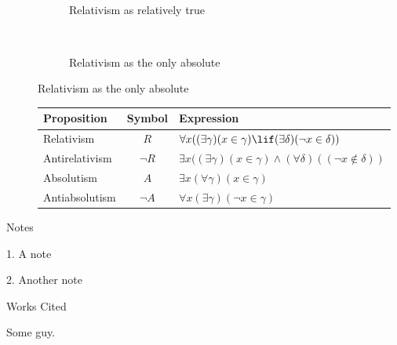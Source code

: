 \documentclass[12pt]{article}
\newcommand{\bibent}{\noindent \hangindent 40pt}
\newenvironment{workscited}{\newpage \begin{center} Works Cited \end{center}}{\newpage }
\begin{document}
\begin{flushleft}
\begin{figure}[h]
\begin{subfigure}{.5\textwidth}
    \fitchctx
    {
        \pline{\bigstar}\\
        \subproof
        {
        }
        {
            \subproof
            {
            }
            {
                \pline{}
            }
            \subproof
            {
            }
            {
                \pline{}
            }
        }
        \subproof
        {
        }
        {
            \subproof
            {
            }
            {
                \pline{}
            }
        }
    }
    \caption{Relativism as relatively true}
\end{subfigure}%
\begin{subfigure}{.5\textwidth}
    \fitchprf
    {
    }
    {
        \pline{\bigstar}\\
        \subproof
        {
        }
        {
            \subproof
            {
            }
            {
                \pline{\lfalse}
            }
        }
    }
    \caption{Relativism as the only absolute}
\end{subfigure}
\end{figure}


\begin{figure}[h]
    \begin{tabular}{l|c|l}
        \hline
        Proposition & Symbol & Expression \\ \hline
        Relativism  & $R$ & $\forall{x}((\exists{\gamma})(x \in \gamma) \lif (\exists{\delta})({\lnot}x \in \delta))$ \\
        Antirelativism & $\neg R$ & $\exists{x}((\exists{\gamma})(x \in \gamma) \land (\forall{\delta})(({\neg}x \notin \delta))$ \\
        Absolutism & $A$ & $\exists{x}(\forall{\gamma})(x \in \gamma)$ \\
        Antiabsolutism & $\neg A$ & $\forall{x}(\exists{\gamma})({\lnot}x \in \gamma)$ \\
    \end{tabular}
\end{figure}

\begin{center}
    Notes
\end{center}
\setlength{\parindent}{0.5in}

1. A note

2. Another note

\begin{workscited}
    \bibent
    Some guy.  
\end{workscited}

\end{flushleft}
\end{document}
